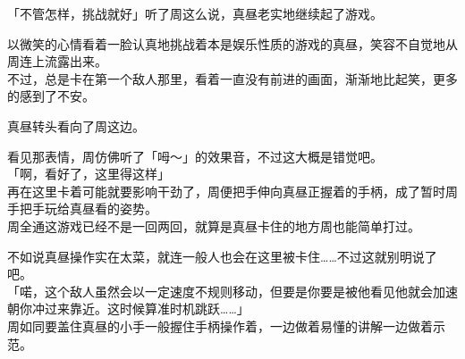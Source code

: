 「不管怎样，挑战就好」听了周这么说，真昼老实地继续起了游戏。

以微笑的心情看着一脸认真地挑战着本是娱乐性质的游戏的真昼，笑容不自觉地从周连上流露出来。\\

不过，总是卡在第一个敌人那里，看着一直没有前进的画面，渐渐地比起笑，更多的感到了不安。

真昼转头看向了周这边。

看见那表情，周仿佛听了「呣～」的效果音，不过这大概是错觉吧。\\

「啊，看好了，这里得这样」\\

再在这里卡着可能就要影响干劲了，周便把手伸向真昼正握着的手柄，成了暂时周手把手玩给真昼看的姿势。\\

周全通这游戏已经不是一回两回，就算是真昼卡住的地方周也能简单打过。

不如说真昼操作实在太菜，就连一般人也会在这里被卡住……不过这就别明说了吧。\\

「喏，这个敌人虽然会以一定速度不规则移动，但要是你要是被他看见他就会加速朝你冲过来靠近。这时候算准时机跳跃……」\\

周如同要盖住真昼的小手一般握住手柄操作着，一边做着易懂的讲解一边做着示范。\\


